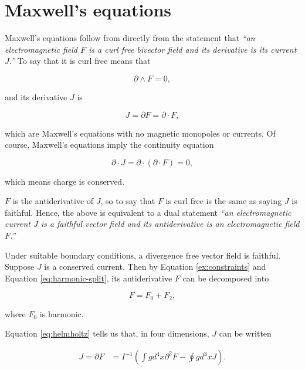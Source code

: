 \documentclass{article}
\begin{document}
\section{Maxwell's equations}

Maxwell's equations follow from directly from the statement that \emph{``an electromagnetic field $F$ is a curl free bivector field and its derivative is its current $J$.''} To say that it is curl free means that

\begin{equation}
  \partial \wedge F = 0,
\end{equation}

and its derivative $J$ is

\begin{equation}
  J = \partial F = \partial \cdot F,
\end{equation} 

which are Maxwell's equations with no magnetic monopoles or currents. Of course, Maxwell's equations imply the continuity equation

\begin{equation}
  \partial \cdot J = \partial \cdot (\partial \cdot F) = 0, \label{eq:continuity}
\end{equation} 

which means charge is conserved. 

$F$ is the antiderivative of $J$, so to say that $F$ is curl free is the same as saying $J$ is faithful. Hence, the above is equivalent to a dual statement \emph{``an electromagnetic current $J$ is a faithful vector field and its antiderivative is an electromagnetic field $F$.''}

Under suitable boundary conditions, a divergence free vector field is faithful. Suppose $J$ is a conserved current. Then by Equation \ref{ex:constraints} and Equation \ref{eq:harmonic-split}, its antiderivative $F$ can be decomposed into 

\begin{equation}
  F = F_0 + F_2,
\end{equation}

where $F_0$ is harmonic.

Equation \ref{eq:helmholtz} tells us that, in four dimensions, $J$ can be written

\begin{align}
  J = \partial F &= I^{-1} \left(\int g d^{4}x \partial^2 F - \oint g d^{3}x J \right).
\end{align}
\end{document}
